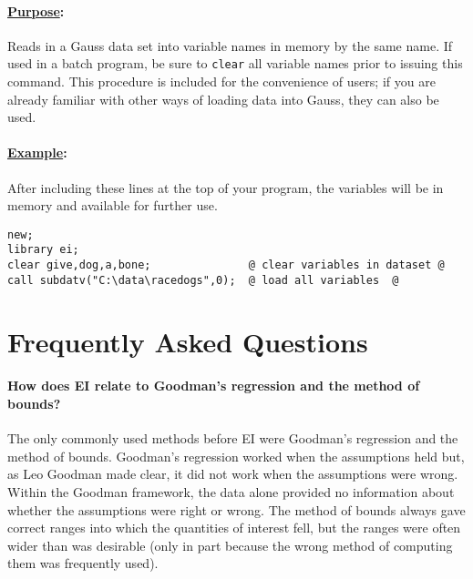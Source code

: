 \documentclass[11pt,titlepage]{article}
\begin{document}
\paragraph{\underline{Purpose}:}
Reads in a Gauss data set into variable names in memory by the same
name.  If used in a batch program, be sure to \texttt{clear} all
variable names prior to issuing this command.  This procedure is
included for the convenience of users; if you are already familiar
with other ways of loading data into Gauss, they can also be used.

\paragraph{\underline{Example}:}
After including these lines at the top of your program, the variables
will be in memory and available for further use.
\begin{verbatim}
new;
library ei;
clear give,dog,a,bone;               @ clear variables in dataset @
call subdatv("C:\data\racedogs",0);  @ load all variables  @
\end{verbatim}

\section{Frequently Asked Questions}

\paragraph{How does EI relate to Goodman's regression and the method
  of bounds?}
The only commonly used methods before EI were Goodman's regression and
the method of bounds.  Goodman's regression worked when the
assumptions held but, as Leo Goodman made clear, it did not work when
the assumptions were wrong.  Within the Goodman framework, the data
alone provided no information about whether the assumptions were right
or wrong.  The method of bounds always gave correct ranges into which
the quantities of interest fell, but the ranges were often wider than
was desirable (only in part because the wrong method of computing them
was frequently used).
\end{document}
